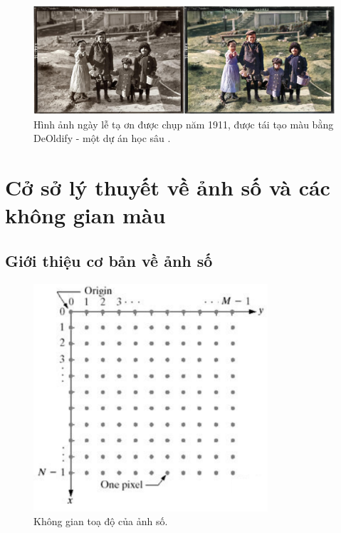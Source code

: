 \documentclass[a4paper, 12pt]{report}
\begin{document}
\begin{figure}[!h]
\captionsetup{width=0.8\textwidth}
\centering
\includegraphics[width=15cm]{images/thanksgiving.jpg}
\caption{Hình ảnh ngày lễ tạ ơn được chụp năm 1911, được tái tạo màu bằng DeOldify - một dự án học sâu \cite{deoldify2020, deoldifyreddit2012}.}
\label{fig:deoldify}
\end{figure}


\chapter{Cở sở lý thuyết về ảnh số và các không gian màu}

\section{Giới thiệu cơ bản về ảnh số}\label{intro2ditimg}

\begin{figure}
\includegraphics[width=8.7cm]{images/pxy.PNG} 
\caption{Không gian toạ độ của ảnh số.}
\label{fig:pxy}
\end{figure}
\end{document}
